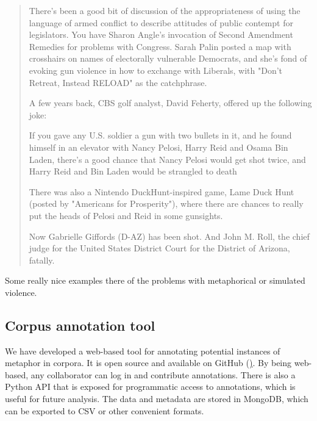 \begin{quotation}
  There's been a good bit of discussion of the appropriateness of using the language of armed conflict to describe attitudes of public contempt for legislators.  You have Sharon Angle's invocation of  Second Amendment Remedies for problems with Congress.  Sarah Palin posted a map with crosshairs on names of electorally vulnerable Democrats, and she's fond of evoking gun violence in how to exchange with Liberals, with "Don't Retreat, Instead RELOAD" as the catchphrase. 

A few years back, CBS golf analyst, David Feherty, offered up the following joke:

If you gave any U.S. soldier a gun with two bullets in it, and he found himself in an elevator with Nancy Pelosi, Harry Reid and Osama Bin Laden, there's a good chance that Nancy Pelosi would get shot twice, and Harry Reid and Bin Laden would be strangled to death

There was also a Nintendo DuckHunt-inspired game, Lame Duck Hunt (posted by "Americans for Prosperity"), where there are chances to really put the heads of  Pelosi and  Reid in some gunsights.  

Now Gabrielle Giffords (D-AZ) has been shot.  And John M. Roll, the chief judge for the United States District Court for the District of Arizona, fatally.  
\end{quotation}

Some really nice examples there of the problems with metaphorical or 
simulated violence.




\subsection{Corpus annotation tool}
\label{sub:Corpus-annotation-tool}

We have developed a web-based tool for annotating potential instances of
metaphor in corpora. It is open source and available on GitHub 
(\href{http://github.com/mtpain/metacorps}). By being web-based, any collaborator
can log in and contribute annotations. There is also a Python API that is
exposed for programmatic access to annotations, which is useful for 
future analysis. The data and metadata are stored in MongoDB, which can be
exported to CSV or other convenient formats. 



